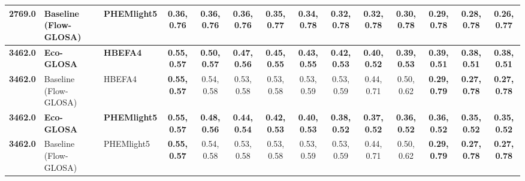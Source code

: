 \begin{table}[htb]
{\begin{tabular}{l l l *{11}{c}}
      \textbf{2769.0}& Baseline (Flow-GLOSA)       & PHEMlight5  & \textbf{0.36, 0.76}  & 0.36, 0.76  & 0.36, 0.76  & 0.35, 0.77  & 0.34, 0.78  & 0.32, 0.78  & 0.32, 0.78  & 0.30, 0.78  & 0.29, 0.78  & 0.28, 0.78  & 0.26, 0.77  \\
      \midrule
      \textbf{3462.0} & \textbf{Eco-GLOSA} & \textbf{HBEFA4} & \textbf{0.55, 0.57} & \textbf{0.50, 0.57} & \textbf{0.47, 0.56} & \textbf{0.45, 0.55} & \textbf{0.43, 0.55} & \textbf{0.42, 0.53} & \textbf{0.40, 0.52} & \textbf{0.39, 0.53} & \textbf{0.39, 0.51} & \textbf{0.38, 0.51} & \textbf{0.38, 0.51} \\
      \textbf{3462.0}& Baseline (Flow-GLOSA)       & HBEFA4      & \textbf{0.55, 0.57}  & 0.54, 0.58  & 0.53, 0.58  & 0.53, 0.58  & 0.53, 0.59  & 0.53, 0.59  & 0.44, 0.71  & 0.50, 0.62  & \textbf{0.29, 0.79}  & \textbf{0.27, 0.78}  & \textbf{0.27, 0.78}  \\
      \textbf{3462.0} & \textbf{Eco-GLOSA} & \textbf{PHEMlight5} & \textbf{0.55, 0.57} & \textbf{0.48, 0.56} & \textbf{0.44, 0.54} & \textbf{0.42, 0.53} & \textbf{0.40, 0.53} & \textbf{0.38, 0.52} & \textbf{0.37, 0.52} & \textbf{0.36, 0.52} & \textbf{0.36, 0.52} & \textbf{0.35, 0.52} & \textbf{0.35, 0.52} \\
      \textbf{3462.0}& Baseline (Flow-GLOSA)       & PHEMlight5  & \textbf{0.55, 0.57}  & 0.54, 0.58  & 0.53, 0.58  & 0.53, 0.58  & 0.53, 0.59  & 0.53, 0.59  & 0.44, 0.71  & 0.50, 0.62  & \textbf{0.29, 0.79}  & \textbf{0.27, 0.78}  & \textbf{0.27, 0.78}  \\
      \bottomrule
    \end{tabular}%
  }
\end{table}
